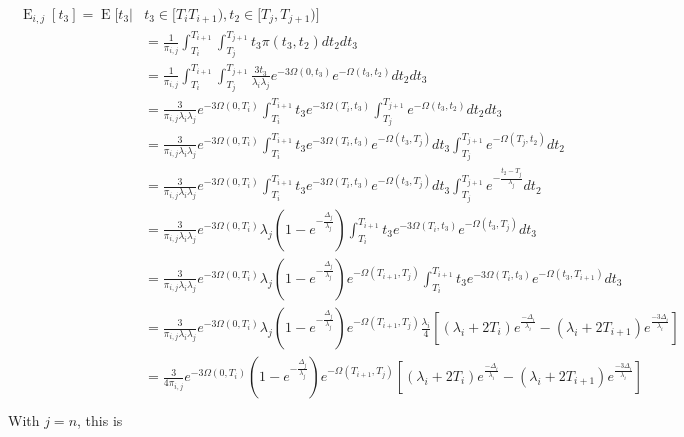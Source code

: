 \documentclass{article}
\DeclareMathOperator{\E}{E}
\begin{document}
\begin{align}
    \begin{split}
        \E_{i,j}[t_3] = \E\big[t_3|&t_3 \in [T_i T_{i+1}),t_2 \in [T_j,T_{j+1}) \big]\\
        &= \frac{1}{\pi_{i,j}}\int_{T_i}^{T_{i+1}}\int_{T_j}^{T_{j+1}}t_3\pi(t_3,t_2)dt_2dt_3\\
        &= \frac{1}{\pi_{i,j}}\int_{T_i}^{T_{i+1}}\int_{T_j}^{T_{j+1}}
            \frac{3t_3}{\lambda_i \lambda_j}e^{-3\Omega(0,t_3)}e^{-\Omega(t_3,t_2)}dt_2dt_3\\
        &=\frac{3}{\pi_{i,j}\lambda_i\lambda_j}e^{-3\Omega(0,T_i)}
            \int_{T_i}^{T_{i+1}}t_3e^{-3\Omega(T_i,t_3)}\int_{T_j}^{T_{j+1}}e^{-\Omega(t_3,t_2)}dt_2dt_3\\
        &=\frac{3}{\pi_{i,j}\lambda_i\lambda_j}e^{-3\Omega(0,T_i)}
            \int_{T_i}^{T_{i+1}}t_3e^{-3\Omega(T_i,t_3)}e^{-\Omega(t_3,T_j)}dt_3\int_{T_j}^{T_{j+1}}e^{-\Omega(T_j,t_2)}dt_2\\
        &=\frac{3}{\pi_{i,j}\lambda_i\lambda_j}e^{-3\Omega(0,T_i)}
            \int_{T_i}^{T_{i+1}}t_3e^{-3\Omega(T_i,t_3)}e^{-\Omega(t_3,T_j)}dt_3\int_{T_j}^{T_{j+1}}e^{-\frac{t_2-T_j}{\lambda_j}}dt_2\\
        &=\frac{3}{\pi_{i,j}\lambda_i\lambda_j}e^{-3\Omega(0,T_i)}\lambda_j\left(1-e^{-\frac{\Delta_j}{\lambda_j}}\right)
            \int_{T_i}^{T_{i+1}}t_3e^{-3\Omega(T_i,t_3)}e^{-\Omega(t_3,T_j)}dt_3\\
        &=\frac{3}{\pi_{i,j}\lambda_i\lambda_j}e^{-3\Omega(0,T_i)}
            \lambda_j\left(1-e^{-\frac{\Delta_j}{\lambda_j}}\right)e^{-\Omega(T_{i+1},T_j)}
            \int_{T_i}^{T_{i+1}}t_3e^{-3\Omega(T_i,t_3)}e^{-\Omega(t_3,T_{i+1})}dt_3\\
        &=\frac{3}{\pi_{i,j}\lambda_i\lambda_j}e^{-3\Omega(0,T_i)}
            \lambda_j\left(1-e^{-\frac{\Delta_j}{\lambda_j}}\right)e^{-\Omega(T_{i+1},T_j)}
            \frac{\lambda_i}{4}\left[(\lambda_i+2T_i)e^{\frac{-\Delta_i}{\lambda_i}}-(\lambda_i+2T_{i+1})e^{\frac{-3\Delta_i}{\lambda_i}}\right]\\
        &=\frac{3}{4\pi_{i,j}}e^{-3\Omega(0,T_i)}
            \left(1-e^{-\frac{\Delta_j}{\lambda_j}}\right)e^{-\Omega(T_{i+1},T_j)}
            \left[(\lambda_i+2T_i)e^{\frac{-\Delta_i}{\lambda_i}}-(\lambda_i+2T_{i+1})e^{\frac{-3\Delta_i}{\lambda_i}}\right]\\
    \end{split}
    \label{eq:Et3}
\end{align}
With $j = n$, this is
\end{document}
